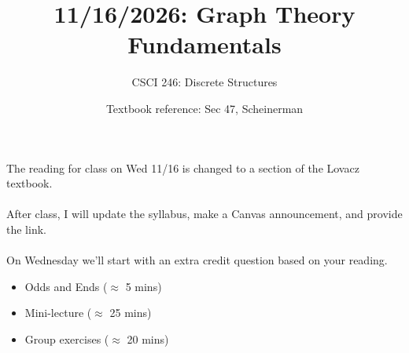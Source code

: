\documentclass[10pt]{beamer}
\begin{document}
\title{11/16/2026: Graph Theory Fundamentals}
\author{CSCI 246: Discrete Structures}
\date{Textbook reference: Sec 47, Scheinerman}

\begin{frame}
    \titlepage 
\end{frame}


\begin{frame}
%
\vfill 

\begin{myredbox}[title=Announcement]
The reading for class on Wed 11/16 is changed to a section of the Lovacz textbook.\\
\\
After class, I will update the syllabus, make a Canvas announcement,  and provide the link.\\
\\
On Wednesday we'll start with an \alert{extra credit} question based on your reading.
\end{myredbox}
\vfill 
\begin{myyellowbox}[title=Today's Agenda]
\begin{itemize}
	\item Odds and Ends ($\approx$ 5 mins)
	\item Mini-lecture ($\approx$ 25 mins)
	\item Group exercises ($\approx$ 20 mins)
\end{itemize}


\end{myyellowbox}
\vfill 

\end{frame}
\end{document}
